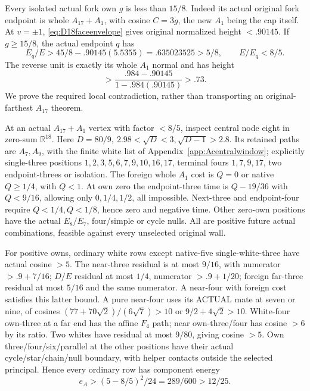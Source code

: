Every isolated actual fork own \(g\) is less than \(15/8\).
Indeed its actual original fork endpoint is whole \(A_{17}+A_1\),
with cosine \(C=3g\), the new \(A_1\) being the cap itself.
At \(v=\pm1\), \eqref{eq:D18faceenvelope} gives original normalized
height \(<.90145\).
If \(g\geq15/8\), the actual endpoint \(q\) has
\[
 E_q/E>45/8-.90145(5.5355)=.635023525>5/8,\qquad
 E/E_q<8/5 .
\]
The reverse unit is exactly its whole \(A_1\) normal and has
height
\[
 >\frac{.984-.90145}{1-.984(.90145)}>.73.
\]
We prove the required local contradiction, rather than transporting
an original-farthest \(A_{17}\) theorem.

At an actual \(A_{17}+A_1\) vertex with factor \(<8/5\),
inspect central node eight in zero-sum \(\mathbb R^{18}\).
Here \(D=80/9,\ 2.98<\sqrt D<3,\sqrt{D-1}>2.8\).
Its retained paths are \(A_7,A_9\), with the finite white list
of Appendix~\ref{app:Acentralwindow}; explicitly single-three
positions \(1,2,3,5,6,7,9,10,16,17\), terminal fours
\(1,7,9,17\), two endpoint-threes or isolation.
The foreign whole \(A_1\) cost is \(Q=0\) or native \(Q\geq1/4\),
with \(Q<1\).
At own zero the endpoint-three time is \(Q-19/36\) with
\(Q<9/16\), allowing only \(0,1/4,1/2\), all impossible.
Next-three and endpoint-four require \(Q<1/4,Q<1/8\),
hence zero and negative time. Other zero-own positions have the
actual \(E_8/E_7\), four/simple or cycle nulls.
All are positive future actual combinations, feasible against
every unselected original wall.

For positive owns, ordinary white rows except native-five
single-white-three have actual cosine \(>5\).
The near-three residual is at most \(9/16\), with numerator
\(>.9+7/16\); \(D/E\) residual at most \(1/4\), numerator
\(>.9+1/20\); foreign far-three residual at most \(5/16\)
and the same numerator. A near-four with foreign cost satisfies
this latter bound. A pure near-four uses its ACTUAL mate at seven
or nine, of cosines
\((77+70\sqrt2)/(6\sqrt7)>10\) or \(9/2+4\sqrt2>10\).
White-four own-three at a far end has the affine \(F_4\) path;
near own-three/four has cosine \(>6\) by its ratio.
Two whites have residual at most \(9/80\), giving cosine \(>5\).
Own three/four/six/parallel at the other positions have their actual
cycle/star/chain/null boundary, with helper contacts outside
the selected principal. Hence every ordinary row has component energy
\[
 e_A>(5-8/5)^2/24=289/600>12/25 .
\]

